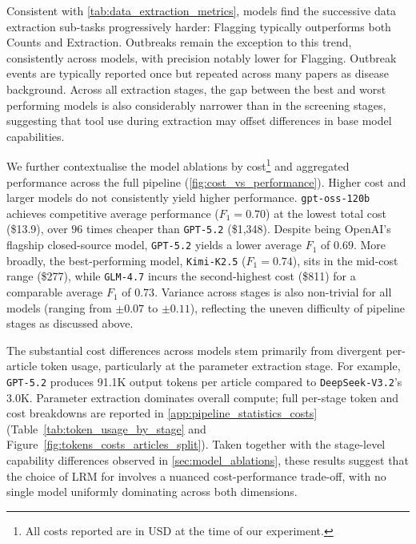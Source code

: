 Consistent with \cref{tab:data_extraction_metrics}, models find the successive data extraction sub-tasks progressively harder: Flagging typically outperforms both Counts and Extraction. Outbreaks remain the exception to this trend, consistently across models, with precision notably lower for Flagging. Outbreak events are typically reported once but repeated across many papers as disease background. Across all extraction stages, the gap between the best and worst performing models is also considerably narrower than in the screening stages, suggesting that tool use during extraction may offset differences in base model capabilities.

\label{sec:cost_performance}


We further contextualise the model ablations by cost\footnote{All costs reported are in USD at the time of our experiment.} and aggregated performance across the full \name{} pipeline (\cref{fig:cost_vs_performance}). Higher cost and larger models do not consistently yield higher performance. \texttt{gpt-oss-120b} achieves competitive average performance ($F_1 = 0.70$) at the lowest total cost (\$13.9), over $96$ times cheaper than \texttt{GPT-5.2} (\$1,348). Despite being OpenAI's flagship closed-source model, \texttt{GPT-5.2} yields a lower average $F_1$ of $0.69$. More broadly, the best-performing model, \texttt{Kimi-K2.5} ($F_1 = 0.74$), sits in the mid-cost range (\$277), while \texttt{GLM-4.7} incurs the second-highest cost (\$811) for a comparable average $F_1$ of $0.73$. Variance across stages is also non-trivial for all models (ranging from $\pm 0.07$ to $\pm 0.11$), reflecting the uneven difficulty of pipeline stages as discussed above.

The substantial cost differences across models stem primarily from divergent per-article token usage, particularly at the parameter extraction stage. For example, \texttt{GPT-5.2} produces \num{91.1}K output tokens per article compared to \texttt{DeepSeek-V3.2}'s \num{3.0}K. Parameter extraction dominates overall compute; full per-stage token and cost breakdowns are reported in \cref{app:pipeline_statistics_costs} (Table~\ref{tab:token_usage_by_stage} and Figure~\ref{fig:tokens_costs_articles_split}). Taken together with the stage-level capability differences observed in \cref{sec:model_ablations}, these results suggest that the choice of LRM for \name{} involves a nuanced cost-performance trade-off, with no single model uniformly dominating across both dimensions.


